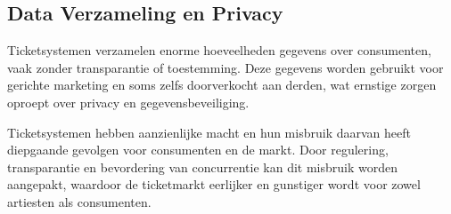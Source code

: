 \subsection{Data Verzameling en Privacy}

Ticketsystemen verzamelen enorme hoeveelheden gegevens over consumenten, 
vaak zonder transparantie of toestemming. 
Deze gegevens worden gebruikt voor gerichte marketing en soms zelfs doorverkocht aan derden, 
wat ernstige zorgen oproept over privacy en gegevensbeveiliging.

\vspace{10 mm}

Ticketsystemen hebben aanzienlijke macht en hun misbruik daarvan heeft diepgaande gevolgen voor consumenten en de markt. 
Door regulering, 
transparantie en bevordering van concurrentie kan dit misbruik worden aangepakt, 
waardoor de ticketmarkt eerlijker en gunstiger wordt voor zowel artiesten als consumenten.